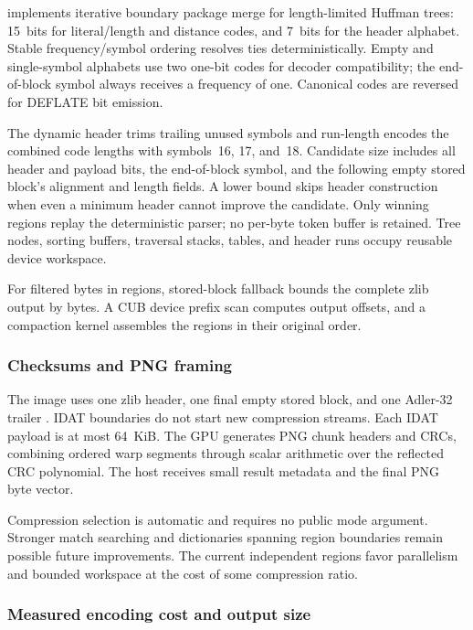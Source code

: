  implements iterative boundary package merge for
length-limited Huffman trees: 15~bits for literal/length and distance
codes, and 7~bits for the header alphabet. Stable frequency/symbol
ordering resolves ties deterministically. Empty and single-symbol
alphabets use two one-bit codes for decoder compatibility; the
end-of-block symbol always receives a frequency of one. Canonical
codes are reversed for DEFLATE bit emission.

The dynamic header trims trailing unused symbols and run-length encodes
the combined code lengths with symbols~16, 17, and~18. Candidate size
includes all header and payload bits, the end-of-block symbol, and the
following empty stored block's alignment and length fields. A lower
bound skips header construction when even a minimum header cannot
improve the candidate. Only winning regions replay the deterministic
parser; no per-byte token buffer is retained. Tree nodes, sorting
buffers, traversal stacks, tables, and header runs occupy reusable
device workspace.

For  filtered bytes in  regions,
stored-block fallback bounds the complete zlib output by
 bytes. A CUB device prefix
scan computes output offsets, and a compaction kernel assembles the
regions in their original order.

\subsubsection{Checksums and PNG framing}

The image uses one zlib header, one final empty stored block, and one
Adler-32 trailer \cite{RFC1950}. IDAT boundaries do not start new
compression streams. Each IDAT payload is at most 64~KiB. The GPU
generates PNG chunk headers and CRCs, combining ordered warp segments
through scalar arithmetic over the reflected CRC polynomial. The host
receives small result metadata and the final PNG byte vector.

Compression selection is automatic and requires no public mode
argument. Stronger match searching and dictionaries spanning region
boundaries remain possible future improvements. The current independent
regions favor parallelism and bounded workspace at the cost of some
compression ratio.

\subsubsection{Measured encoding cost and output size}
\label{subsec:png-benchmarks}

